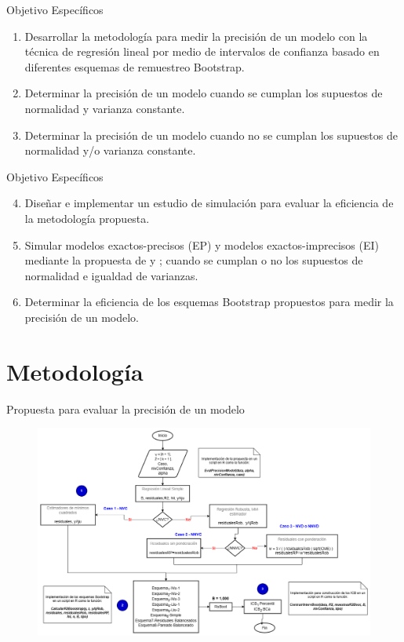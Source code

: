 \documentclass[serif, aspectratio=169]{beamer}
\begin{document}
\begin{frame}{Objetivo Específicos}
\begin{enumerate}
	\item Desarrollar la metodología para medir la precisión de un modelo con la técnica de regresión lineal por medio de intervalos de confianza basado en diferentes esquemas de remuestreo Bootstrap.
	\item Determinar la precisión de un modelo cuando se cumplan los supuestos de normalidad y varianza constante.
	\item Determinar la precisión de un modelo cuando no se cumplan los supuestos de normalidad y/o varianza constante.
\end{enumerate}
\end{frame}


\begin{frame}{Objetivo Específicos}
 \begin{enumerate}
	\setcounter{enumi}{3}
	\item Diseñar e implementar un estudio de simulación para evaluar la eficiencia de la metodología propuesta.
	\item Simular modelos exactos-precisos (EP) y modelos exactos-imprecisos (EI) mediante la propuesta de \textcite{febles-2014} y \textcite{zacarias-2023}; cuando se cumplan o no los supuestos de normalidad e igualdad de varianzas.
	\item Determinar la eficiencia de los esquemas Bootstrap propuestos para medir la precisión de un modelo.
\end{enumerate}
\end{frame}



\section{Metodología}

\begin{frame}{Propuesta para evaluar la precisión de un modelo}
	
	\begin{figure}[ht!]
		\centering 
		\includegraphics[width=0.75\linewidth]{recurso/Metodologia_v14.png} 
		\label{fig:AlgDifEsqICBBoots}
	\end{figure}
	
\end{frame}
\end{document}
